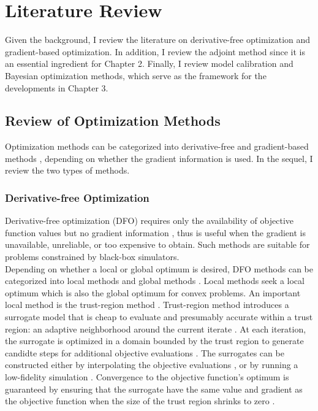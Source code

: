 \section{Literature Review}
\label{section: literature}

Given the background, I review the literature on derivative-free optimization and gradient-based optimization. In addition,
I review the adjoint method since it is an essential ingredient for Chapter 2. Finally, I review model calibration and Bayesian optimization methods, which serve as the framework for the developments in Chapter 3.
\subsection{Review of Optimization Methods}
\label{sec: review optimization}
Optimization methods can be categorized into derivative-free and gradient-based methods 
\cite{gradfreereview}, depending on whether the gradient information is used. 
In the sequel, I review the two types of methods.\\
\subsubsection{Derivative-free Optimization}
\label{section: DFO}
Derivative-free optimization (DFO) requires only the availability of objective
function values but no gradient information \cite{gradfreereview}, thus is useful when the gradient
is unavailable, unreliable, or too expensive to obtain. 
Such methods are suitable for problems constrained by black-box simulators.\\

Depending on whether a local or global optimum is desired,
DFO methods can be categorized into local methods and global methods \cite{gradfreereview}.
Local methods seek a local optimum which is also the global optimum for convex problems. 
An important local method is the
trust-region method \cite{trust region review}. Trust-region method introduces a surrogate model that is
cheap to evaluate and presumably accurate within a trust region: an adaptive neighborhood around the current iterate \cite{trust region review}. 
At each iteration, the surrogate is optimized in a domain bounded by the trust region to generate
candidte steps for additional objective evaluations \cite{trust region review}.
The surrogates can be constructed either by interpolating the objective evaluations \cite{linear trust region, trustregionwild}, or by running a low-fidelity simulation \cite{MFO trust region,
Alexandrov trust region}.
Convergence to the objective function's optimum is guaranteed by ensuring that
the surrogate have the
same value and gradient as the objective function when the size of the trust region shrinks to zero
\cite{trustregionconn, trustregionwild}.\\

